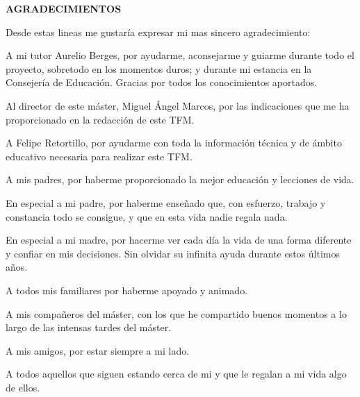 \documentclass[spanish,12pt,a4paper,twoside,openright]{report}
\newcommand\blankpage{%
	\null
	\thispagestyle{empty}%
	\addtocounter{page}{-1}%
	\newpage}
\begin{document}

\begin{titlepage}

\begin{flushright}
{\large \bf AGRADECIMIENTOS}
\vspace{10pt}

{\normalsize Desde estas lineas me gustaría expresar mi mas sincero agradecimiento: 
	
A mi tutor Aurelio Berges, por ayudarme, aconsejarme y guiarme durante todo el proyecto, sobretodo en los momentos duros; y durante mi estancia en la Consejería de Educación. Gracias por todos los conocimientos aportados.

Al director de este máster, Miguel Ángel Marcos, por las indicaciones que me ha proporcionado en la redacción de este TFM.

A Felipe Retortillo, por ayudarme con toda la información técnica y de ámbito educativo necesaria para realizar este TFM.

A mis padres, por haberme proporcionado la mejor educación y lecciones de vida.

En especial a mi padre, por haberme enseñado que, con esfuerzo, trabajo y constancia todo se consigue, y que en esta vida nadie regala nada.

En especial a mi madre, por hacerme ver cada día la vida de una forma diferente y confiar en mis decisiones. Sin olvidar su infinita ayuda durante estos últimos años.

A todos mis familiares por haberme apoyado y animado.

A mis compañeros del máster, con los que he compartido buenos momentos a lo largo de las intensas tardes del máster.

A mis amigos, por estar siempre a mi lado.

A todos aquellos que siguen estando cerca de mi y que le regalan a mi vida algo de ellos.}
\end{flushright}
\end{titlepage}
\blankpage
\end{document}
